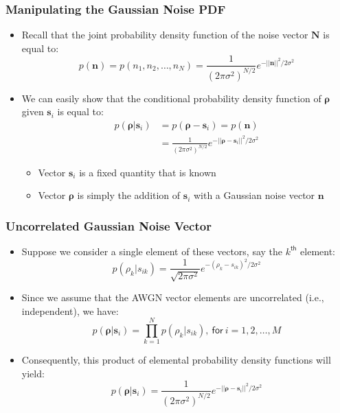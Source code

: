 \documentclass[10pt]{beamer}
\begin{document}
\frame
{
  \frametitle{Manipulating the Gaussian Noise PDF}

    \begin{itemize}
        \item Recall that the joint probability density function of the noise vector $\mathbf{N}$ is equal to:
        \begin{equation}
            p(\mathbf{n})=p(n_1,n_2,\ldots,n_N)=\frac{1}{(2\pi\sigma^2)^{N/2}}{e^{-||\mathbf{n}||^2/2\sigma^2}}
        \end{equation}
        \item We can easily show that the conditional probability density function of $\mathbf{\rho}$ given $\mathbf{s}_i$ is equal to:
        \begin{equation}
        \begin{split}
            p(\mathbf{\rho}|\mathbf{s}_i)&=p(\mathbf{\rho}-\mathbf{s}_i)=p(\mathbf{n})\\
            &=\frac{1}{(2\pi\sigma^2)^{N/2}}{e^{-||\mathbf{\rho}-\mathbf{s}_i||^2/2\sigma^2}}
        \end{split}
        \end{equation}
        \begin{itemize}
            \item Vector $\mathbf{s}_i$ is a fixed quantity that is known
            \item Vector $\mathbf{\rho}$ is simply the addition of $\mathbf{s}_i$ with a Gaussian noise vector $\mathbf{n}$
        \end{itemize}
    \end{itemize}

}

\frame
{
  \frametitle{Uncorrelated Gaussian Noise Vector}

    \begin{itemize}
        \item Suppose we consider a single element of these vectors, say the $k^{\mathsf{th}}$ element:
        \begin{equation}
            p({\rho}_k|{s}_{ik})=\frac{1}{\sqrt{2\pi\sigma^2}}{e^{-({\rho}_k-{s}_{ik})^2/2\sigma^2}}
        \end{equation}
        \item Since we assume that the AWGN vector elements are uncorrelated (i.e., independent), we have:
        \begin{equation}
            p(\mathbf{\rho}|\mathbf{s}_i)=\prod\limits_{k=1}^{N}p({\rho}_k|{s}_{ik}),~\mathsf{for}~i=1,2,\ldots,M
        \end{equation}
        \item Consequently, this product of elemental probability density functions will yield:
        \begin{equation}
            p(\mathbf{\rho}|\mathbf{s}_i)=\frac{1}{(2\pi\sigma^2)^{N/2}}{e^{-||\mathbf{\rho}-\mathbf{s}_i||^2/2\sigma^2}}
        \end{equation}
    \end{itemize}

}
\end{document}
